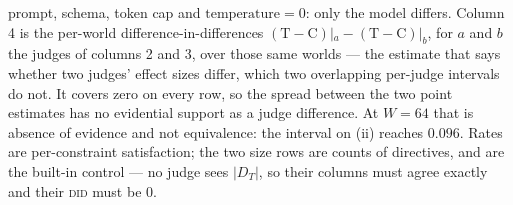 \begin{table}[t]
{    prompt, schema, token cap and $\text{temperature}{=}0$: only the model differs. Column 4 is the
    per-world difference-in-differences $(\text{T}-\text{C})|_a - (\text{T}-\text{C})|_b$, for $a$
    and $b$ the judges of columns 2 and 3, over those same worlds --- the estimate that says whether
    two judges' effect sizes differ, which two overlapping per-judge intervals do not. It covers zero on every row, so the spread between the
    two point estimates has no evidential support as a judge difference. At $W{=}64$ that
    is absence of evidence and not equivalence: the interval on (ii) reaches $0.096$. Rates
    are per-constraint satisfaction; the two size rows are counts of directives, and are the
    built-in control --- no judge sees $|D_T|$, so their columns must agree exactly and their
    \textsc{did} must be $0$.
  }
  \label{tab:judges}
\end{table}

